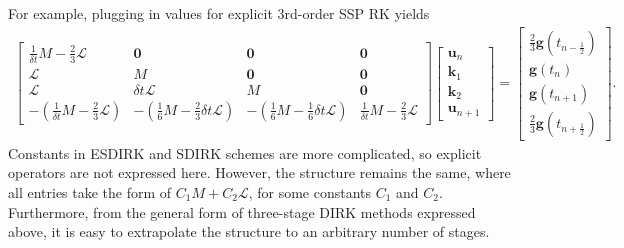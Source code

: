 \documentclass[a4paper,10pt]{article}
\begin{document}
For example, plugging in values for explicit 3rd-order SSP RK yields
\begin{align*}
\begin{bmatrix} \tfrac{1}{\delta t}M - \tfrac{2}{3}\mathcal{L} & \mathbf{0}  & \mathbf{0} & \mathbf{0}  \\
	\mathcal{L} & M & \mathbf{0} & \mathbf{0} \\
	\mathcal{L} & \delta t \mathcal{L} & M & \mathbf{0} \\
	-\left(\tfrac{1}{\delta t}M - \tfrac{2}{3}\mathcal{L}\right) & -\left(\tfrac{1}{6}M  - \tfrac{2}{3}\delta t\mathcal{L}\right) &
	-\left(\tfrac{1}{6}M  - \tfrac{1}{6}\delta t \mathcal{L}\right) & \tfrac{1}{\delta t}M - \tfrac{2}{3}\mathcal{L}  \end{bmatrix}
	\begin{bmatrix} \mathbf{u}_n \\ \mathbf{k}_1 \\ \mathbf{k}_2 \\ \mathbf{u}_{n+1} \end{bmatrix} =
	\begin{bmatrix} \tfrac{2}{3}\mathbf{g}(t_{n-\frac{1}{2}}) \\ \mathbf{g}(t_{n}) \\ \mathbf{g}(t_{n+1}) \\ \tfrac{2}{3}\mathbf{g}(t_{n+\frac{1}{2}}) \end{bmatrix}.
\end{align*}
%
Constants in ESDIRK and SDIRK schemes are more complicated, so explicit operators are not expressed here.
However, the structure remains the same, where all entries take the form of $C_1M + C_2\mathcal{L}$, for
some constants $C_1$ and $C_2$. Furthermore, from the general form of three-stage DIRK methods
expressed above, it is easy to extrapolate the structure to an arbitrary number of stages.


\end{document}
